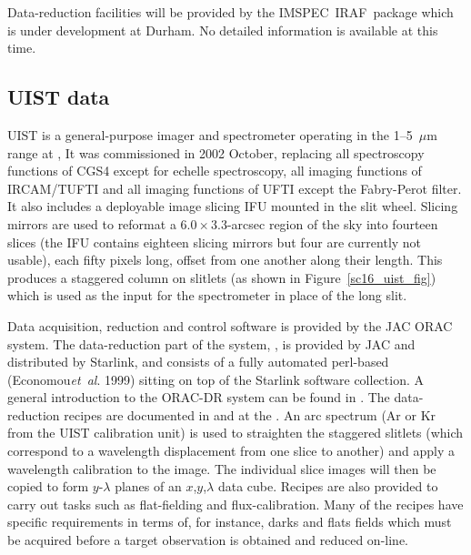 \documentclass[twoside,11pt]{starlink}
\providecommand{\IMSPEC}{{\footnotesize IMSPEC}\normalsize}
\providecommand{\IRAF}{\footnotesize{IRAF}\normalsize}
\begin{document}
Data-reduction facilities will be provided by the \IMSPEC\ \IRAF\
package which is under development at Durham.  No detailed information
is available at this time.

\subsection{UIST data\label{sc16_uist}}

UIST is a general-purpose imager and spectrometer operating in the
1--5~$\mu$m range at
, It was
commissioned in 2002 October, replacing all spectroscopy functions of
CGS4 except for echelle spectroscopy, all imaging functions of
IRCAM/TUFTI and all imaging functions of UFTI except the Fabry-Perot
filter.  It also includes a deployable image slicing IFU mounted in
the slit wheel.  Slicing mirrors are used to reformat a
$6.0\times3.3$-arcsec region of the sky into fourteen slices (the IFU
contains eighteen slicing mirrors but four are currently not usable),
each fifty pixels long, offset from one another along their length.  This
produces a staggered column on slitlets (as shown in
Figure~\ref{sc16_uist_fig}) which is used as the input for the
spectrometer in place of the long slit.


Data acquisition, reduction and control software is provided by the
JAC ORAC system.  The
data-reduction part of the system,
,
is provided by JAC and distributed by Starlink, and consists of a
fully automated perl-based 
(Economou\emph{et~al}. 1999) sitting on top of the Starlink software
collection.  A general introduction to the ORAC-DR system can be found
in \xref{SUN/230}{sun230}{}.  The data-reduction recipes are
documented in  and at the
.
An arc spectrum (Ar or Kr from the UIST calibration unit) is used to
straighten the staggered slitlets (which correspond to a wavelength
displacement from one slice to another) and apply a wavelength
calibration to the image.  The individual slice images will then be
copied to form $y$-$\lambda$ planes of an $x$,$y$,$\lambda$ data cube.
Recipes are also provided to carry out tasks such as flat-fielding and
flux-calibration.  Many of the recipes have specific requirements in
terms of, for instance, darks and flats fields which must be acquired
before a target observation is obtained and reduced on-line.
\end{document}
